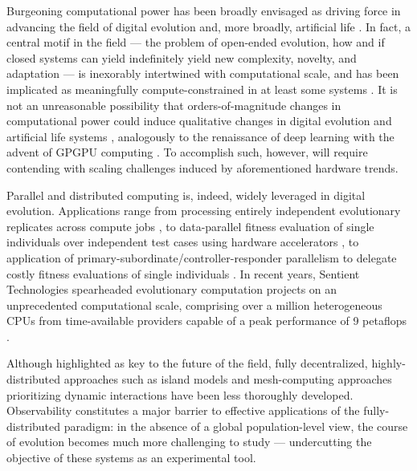 Burgeoning computational power has been broadly envisaged as driving force in advancing the field of digital evolution and, more broadly, artificial life \citep{ackley2014indefinitely}.
In fact, a central motif in the field --- the problem of open-ended evolution, how and if closed systems can yield indefinitely yield new complexity, novelty, and adaptation --- is inexorably intertwined with computational scale, and has been implicated as meaningfully compute-constrained in at least some systems \citep{taylor2016open,channon2019maximum}.
It is not an unreasonable possibility that orders-of-magnitude changes in computational power could induce qualitative changes in digital evolution and artificial life systems \citep{moreno2022engineering}, analogously to the renaissance of deep learning with the advent of GPGPU computing \citep{krizhevsky2012imagenet}.
To accomplish such, however, will require contending with scaling challenges induced by aforementioned hardware trends.

Parallel and distributed computing is, indeed, widely leveraged in digital evolution.
Applications range from processing entirely independent evolutionary replicates across compute jobs \citep{dolson2017spatial, hornby2006automated}, to data-parallel fitness evaluation of single individuals over independent test cases using hardware accelerators \citep{harding2007fast_springer, langdon2019continuous}, to application of primary-subordinate/controller-responder parallelism to delegate costly fitness evaluations of single individuals \citep{cantu2001master,miikkulainen2019evolving}.
In recent years, Sentient Technologies spearheaded evolutionary computation projects on an unprecedented computational scale, comprising over a million heterogeneous CPUs from time-available providers capable of a peak performance of 9 petaflops \citep{miikkulainen2019evolving,gilbert2015artificial,blondeau2009distributed}.

Although highlighted as key to the future of the field, fully decentralized, highly-distributed approaches such as island models \citep{bennett1999building,schulte2010genetic} and mesh-computing approaches prioritizing dynamic interactions \citep{ray1995proposal,ackley2018digital,moreno2021conduit} have been less thoroughly developed.
Observability constitutes a major barrier to effective applications of the fully-distributed paradigm: in the absence of a global population-level view, the course of evolution becomes much more challenging to study --- undercutting the objective of these systems as an experimental tool.

